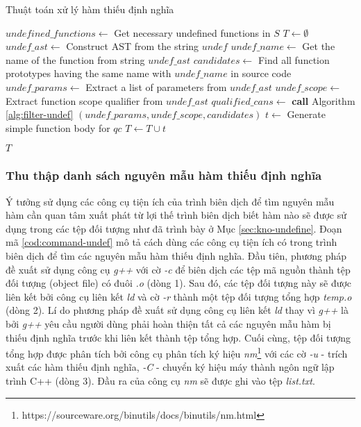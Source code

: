\begin{algorithm}[ht]
    \small
    \caption{Thuật toán xử lý hàm thiếu định nghĩa}
    \label{alg:handle-ref}
					
    $undefined\_functions \leftarrow $ Get necessary undefined functions in $S$\;
    $T \leftarrow \emptyset$\;
     {
        $undef\_ast\leftarrow$ Construct AST from the string $undef$\;
        $undef\_name \leftarrow$ Get the name of the function from string $undef\_ast$\;
        $candidates \leftarrow$ Find all function prototypes having the same name with $undef\_name$ in source code\;
        $undef\_params \leftarrow$ Extract a list of parameters from $undef\_ast$\;
        $undef\_scope\leftarrow$ Extract function scope qualifier from $undef\_ast$\;
        $qualified\_cans\leftarrow$ \textbf{call} Algorithm \autoref{alg:filter-undef} $(undef\_params, undef\_scope, candidates)$\;
         {
            $t \leftarrow $ Generate simple function body for $qc$\;
            $T \leftarrow T \cup {t}$
        }
    }

    \Return $T$
\end{algorithm}

\subsubsection*{Thu thập danh sách nguyên mẫu hàm thiếu định nghĩa}\label{sec:find-undef}
Ý tưởng sử dụng các công cụ tiện ích của trình biên dịch để tìm nguyên mẫu hàm cần quan tâm xuất phát từ lợi thế trình biên dịch biết hàm nào sẽ được sử dụng trong các tệp đối tượng như đã trình bày ở Mục \autoref{sec:kno-undefine}. Đoạn mã \autoref{cod:command-undef} mô tả cách dùng các công cụ tiện ích có trong trình biên dịch để tìm các nguyên mẫu hàm thiếu định nghĩa. Đầu tiên, phương pháp đề xuất sử dụng công cụ \textit{g++} với cờ \textit{-c} để biên dịch các tệp mã nguồn thành tệp đối tượng (object file) có đuôi \textit{.o} (dòng 1). Sau đó, các tệp đối tượng này sẽ được liên kết bởi công cụ liên kết \textit{ld} và cờ \textit{-r} thành một tệp đối tượng tổng hợp \textit{temp.o} (dòng 2). Lí do phương pháp đề xuất sử dụng công cụ liên kết \textit{ld} thay vì \textit{g++} là bởi \textit{g++} yêu cầu người dùng phải hoàn thiện tất cả các nguyên mẫu hàm bị thiếu định nghĩa trước khi liên kết thành tệp tổng hợp. Cuối cùng, tệp đối tượng tổng hợp được phân tích bởi công cụ phân tích ký hiệu \textit{nm}\footnote{https://sourceware.org/binutils/docs/binutils/nm.html} với các cờ \textit{-u} - trích xuất các hàm thiếu định nghĩa, \textit{-C} - chuyển ký hiệu máy thành ngôn ngữ lập trình C++ (dòng 3). Đầu ra của công cụ \textit{nm} sẽ được ghi vào tệp \textit{list.txt}.\\


